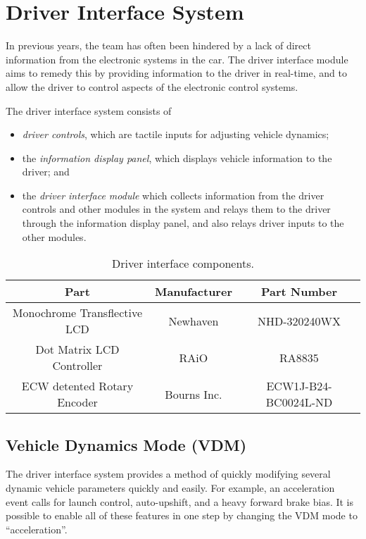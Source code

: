 %
%

\section{Driver Interface System}
\label{sec:driver_interface_system}


In previous years, the team has often been hindered by a lack of direct information from the electronic systems in the car. The driver interface module aims to remedy this by providing information to the driver in real-time, and to allow the driver to control aspects of the electronic control systems.

The driver interface system consists of

\begin{itemize}
\item \emph{driver controls}, which are tactile inputs for adjusting vehicle dynamics; 
\item the \emph{information display panel}, which displays vehicle information to the driver; and
\item the \emph{driver interface module} which collects information from the driver controls and other modules in the system and relays them to the driver through the information display panel, and also relays driver inputs to the other modules.
\end{itemize}

\begin{table}[H]
	\caption{Driver interface components.}
	\label{table:driver_interface_components}
	\centering
	\begin{tabular}{|c|c|c|}
		\hline 
		Part & Manufacturer & Part Number\tabularnewline
		\hline
		\hline 
		Monochrome Transflective LCD & Newhaven & NHD-320240WX\tabularnewline
		\hline 
		Dot Matrix LCD Controller & RAiO & RA8835\tabularnewline
		\hline 
		ECW detented Rotary Encoder & Bourns Inc. & ECW1J-B24-BC0024L-ND\tabularnewline
		\hline
	\end{tabular}
\end{table}

\subsection{Vehicle Dynamics Mode (VDM)}

The driver interface system provides a method of quickly modifying several dynamic vehicle parameters quickly and easily. For example, an acceleration event calls for launch control, auto-upshift, and a heavy forward brake bias. It is possible to enable all of these features in one step by changing the VDM mode to {}``acceleration''. 

